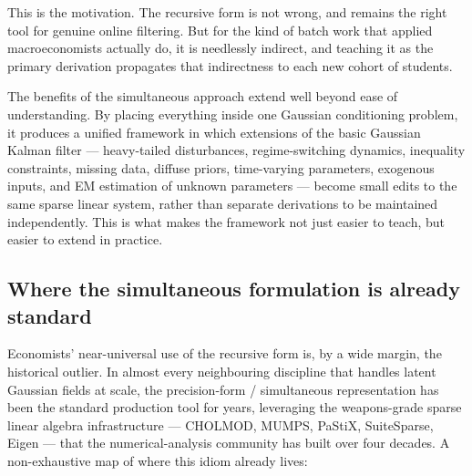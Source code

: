 \documentclass[11pt]{article}
\begin{document}
This is the motivation.  The recursive form is not wrong, and remains
the right tool for genuine online filtering.  But for the kind of batch
work that applied macroeconomists actually do, it is needlessly
indirect, and teaching it as the primary derivation propagates that
indirectness to each new cohort of students.

The benefits of the simultaneous approach extend well beyond ease of
understanding.  By placing everything inside one Gaussian conditioning
problem, it produces a unified framework in which extensions of the
basic Gaussian Kalman filter --- heavy-tailed disturbances,
regime-switching dynamics, inequality constraints, missing data,
diffuse priors, time-varying parameters, exogenous inputs, and EM
estimation of unknown parameters --- become small edits to the same
sparse linear system, rather than separate derivations to be
maintained independently.  This is what makes the framework not just
easier to teach, but easier to extend in practice.

\subsection{Where the simultaneous formulation is already standard}
\label{sec:where-used}

Economists' near-universal use of the recursive form is, by a wide
margin, the historical outlier.  In almost every neighbouring
discipline that handles latent Gaussian fields at scale, the
precision-form / simultaneous representation has been the standard
production tool for years, leveraging the weapons-grade sparse linear
algebra infrastructure --- CHOLMOD, MUMPS, PaStiX, SuiteSparse,
Eigen --- that the numerical-analysis community has built over four
decades.  A non-exhaustive map of where this idiom already lives:
\end{document}
